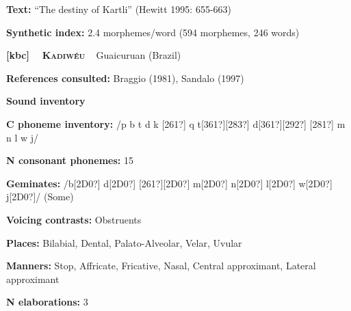 \begin{styleBody}
\textbf{Text:} “The destiny of Kartli” (Hewitt 1995: 655-663)
\end{styleBody}

\begin{styleBody}
\textbf{Synthetic index: }2.4 morphemes/word (594 morphemes, 246 words)
\end{styleBody}

\clearpage\begin{styleBody}
\textbf{[kbc] }\ \ \textbf{\textsc{Kadiwéu}}\textbf{\ \ }Guaicuruan (Brazil)
\end{styleBody}

\begin{styleBody}
\textbf{References consulted: }Braggio (1981), Sandalo (1997)
\end{styleBody}

\begin{styleBody}
\textbf{Sound inventory}
\end{styleBody}

\begin{styleBody}
\textbf{C phoneme inventory:} /p b t d k [261?] q t[361?][283?] d[361?][292?] [281?] m n l w j/
\end{styleBody}

\begin{styleBody}
\textbf{N consonant phonemes:} 15
\end{styleBody}

\begin{styleBody}
\textbf{Geminates:} /b[2D0?] d[2D0?] [261?][2D0?] m[2D0?] n[2D0?] l[2D0?] w[2D0?] j[2D0?]/ (Some)
\end{styleBody}

\begin{styleBody}
\textbf{Voicing contrasts:} Obstruents
\end{styleBody}

\begin{styleBody}
\textbf{Places:} Bilabial, Dental, Palato-Alveolar, Velar, Uvular
\end{styleBody}

\begin{styleBody}
\textbf{Manners:} Stop, Affricate, Fricative, Nasal, Central approximant, Lateral approximant
\end{styleBody}

\begin{styleBody}
\textbf{N elaborations:} 3
\end{styleBody}

